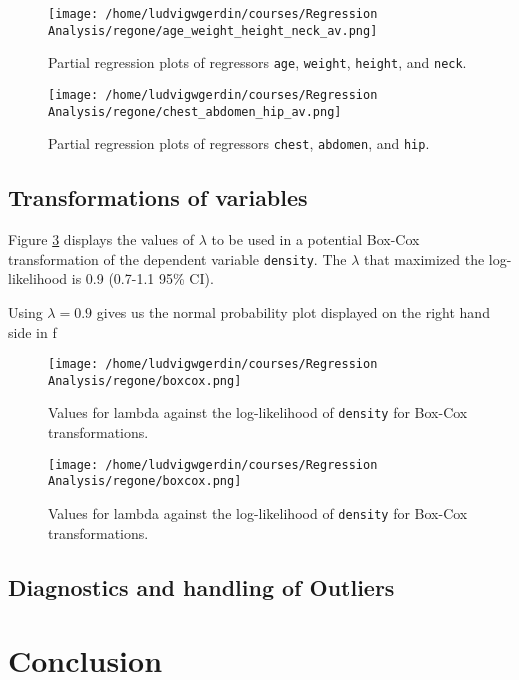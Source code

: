 \documentclass[11pt]{article}
\begin{document}
\begin{figure}[htbp]
\centering
\texttt{[image: /home/ludvigwgerdin/courses/Regression Analysis/regone/age\_weight\_height\_neck\_av.png]}
\caption{\label{fig:orgbc55cc7}
Partial regression plots of regressors \texttt{age}, \texttt{weight}, \texttt{height}, and \texttt{neck}.}
\end{figure}

\begin{figure}[htbp]
\centering
\texttt{[image: /home/ludvigwgerdin/courses/Regression Analysis/regone/chest\_abdomen\_hip\_av.png]}
\caption{\label{fig:org01d5983}
Partial regression plots of regressors \texttt{chest}, \texttt{abdomen}, and \texttt{hip}.}
\end{figure}
\subsection{Transformations of variables}
\label{sec:org706516b}

Figure \ref{fig:orgc8160d4} displays the values of \(\lambda\) to be used in a potential Box-Cox transformation of 
the dependent variable \texttt{density}. The \(\lambda\) that maximized the log-likelihood is 0.9 (0.7-1.1 95\% CI). 

Using \(\lambda = 0.9\) gives us the normal probability plot displayed on the right hand side in f
\begin{figure}[h]
\centering
\texttt{[image: /home/ludvigwgerdin/courses/Regression Analysis/regone/boxcox.png]}
\caption{\label{fig:orgc8160d4}
Values for lambda against the log-likelihood of \texttt{density} for Box-Cox transformations.}
\end{figure}

\begin{figure}[h]
\centering
\texttt{[image: /home/ludvigwgerdin/courses/Regression Analysis/regone/boxcox.png]}
\caption{\label{fig:org7f3a695}
Values for lambda against the log-likelihood of \texttt{density} for Box-Cox transformations.}
\end{figure}

\subsection{Diagnostics and handling of Outliers}
\label{sec:org3c2b038}
\section{Conclusion}
\label{sec:orge36a387}


\end{document}
